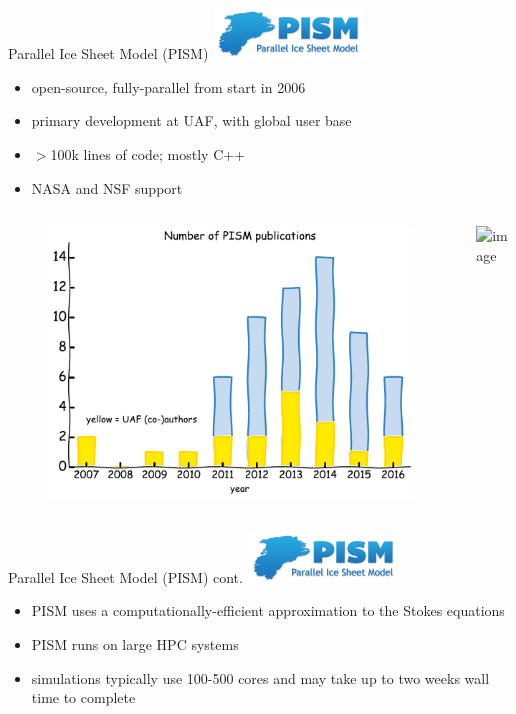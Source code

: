 \documentclass[hide notes,intlimits]{beamer}
\begin{document}
\begin{frame}{Parallel Ice Sheet Model (PISM)}
  \includegraphics[width=4cm]{pism-logo}
  \begin{itemize}
  \item open-source, fully-parallel from start in 2006
  \item primary development at UAF, with global user base
  \item $>$100k lines of code; mostly C++
  \item NASA and NSF support
  \end{itemize}
  \begin{columns}
    \column[c]{4.75cm}
    \begin{figure}
      \includegraphics[width=\textwidth]{pism-uaf-publications}
    \end{figure}
    \column[c]{5cm}
    \includegraphics<1>[width=.7\textwidth]{pism-users}
  \end{columns}
\end{frame}

\begin{frame}{Parallel Ice Sheet Model (PISM) cont.}
  \includegraphics[width=4cm]{pism-logo}
  \begin{itemize}
  \item PISM uses a computationally-efficient approximation to the Stokes equations
  \item PISM runs on large HPC systems
  \item simulations typically use 100-500 cores and may take up to two weeks wall time to complete
  \end{itemize}
\end{frame}
\end{document}
